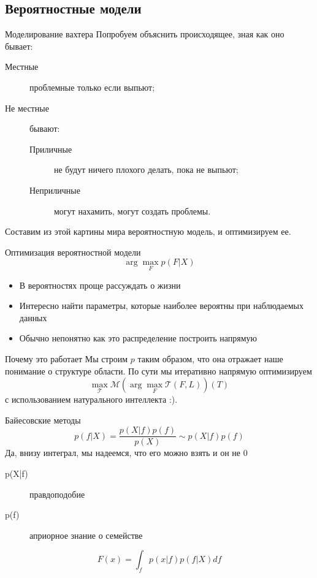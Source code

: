 \documentclass[14pt, fleqn, xcolor={dvipsnames, table}]{beamer}
\begin{document}
\subsection{Вероятностные модели}

\begin{frame}{Моделирование вахтера}
Попробуем объяснить происходящее, зная как оно бывает:
\begin{description}
  \item[Местные] проблемные только если выпьют;
  \item[Не местные] бывают:
  \begin{description}
    \item[Приличные] не будут ничего плохого делать, пока не выпьют;
    \item[Неприличные] могут нахамить, могут создать проблемы.
  \end{description}
\end{description}
Составим из этой картины мира вероятностную модель, и оптимизируем ее.
\end{frame}

\begin{frame}{Оптимизация вероятностной модели}
$$
\arg \max_F p(F|X)
$$
\begin{itemize}
  \item В вероятностях проще рассуждать о жизни
  \item Интересно найти параметры, которые наиболее вероятны при наблюдаемых данных
  \item Обычно непонятно как это распределение построить напрямую
\end{itemize}
\end{frame}

\begin{frame}{Почему это работает}
Мы строим $p$ таким образом, что она отражает наше понимание о структуре области. По сути мы итеративно напрямую оптимизируем
$$
\max_{\mathcal{T}} \mathcal{M} \left(\arg\max_{F} \mathcal{T}(F, L)\right)(T)
$$
с использованием натурального интеллекта :).
\end{frame}
\begin{frame}{Байесовские методы}
$$
p(f | X) = \frac{p(X|f) p(f)}{p(X)} \sim p(X|f) p(f)
$$
Да, внизу интеграл, мы надеемся, что его можно взять и он не 0
\begin{description}
  \item[p(X|f)] правдоподобие
  \item[p(f)] априорное знание о семействе
\end{description}
$$
F(x) = \int_f p(x|f) p(f|X) df
$$
\end{frame}
\end{document}
